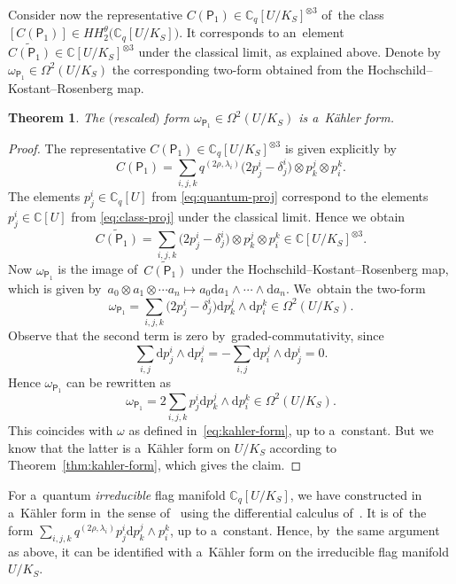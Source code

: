 \documentclass[pdftex]{sigma}
\numberwithin{equation}{section}
\newtheorem{Theorem}{Theorem}[section]
\newcommand{\CU}{\mathbb{C}[U]}
\newcommand{\CqU}{\mathbb{C}_q[U]}
\newcommand{\Cqflag}{\mathbb{C}_q[U / K_S]}
\newcommand{\diff}{\mathrm{d}}
\newcommand{\bbC}{\mathbb{C}}
\newcommand{\proj}{\mathsf{P}}
\newcommand{\kafo}{\omega}
\begin{document}
Consider now the representative $C(\proj_1) \in \Cqflag^{\otimes 3}$ of~the class $[C(\proj_1)] \in HH^\theta_2\big(\Cqflag\big)$.
It corresponds to an~element $\widetilde{C(\proj_1)} \in \bbC[U / K_S]^{\otimes 3}$ under the classical limit, as explained above.
Denote by~$\omega_{\proj_1} \in \Omega^2(U / K_S)$ the corresponding two-form obtained from the Hoch\-schild--Kostant--Rosenberg map.

\begin{Theorem}
The $($rescaled$)$ form $\omega_{\proj_1} \in \Omega^2(U / K_S)$ is a~K\"ahler form.
\end{Theorem}

\begin{proof}
The representative $C(\proj_1) \in \Cqflag^{\otimes 3}$ is given explicitly by
\[
C(\proj_1) = \sum_{i, j, k} q^{(2 \rho, \lambda_i)} \big(2 p^i_j - \delta^i_j\big) \otimes p^j_k \otimes p^k_i.
\]
The elements $p^i_j \in \CqU$ from \eqref{eq:quantum-proj} correspond to the elements $p^i_j \in \CU$ from \eqref{eq:class-proj} under the classical limit.
Hence we obtain
\[
\widetilde{C(\proj_1)} = \sum_{i, j, k} \big(2 p^i_j - \delta^i_j\big) \otimes p^j_k \otimes p^k_i \in \bbC[U / K_S]^{\otimes 3}.
\]
Now $\omega_{\proj_1}$ is the image of~$\widetilde{C(\proj_1)}$ under the Hoch\-schild--Kostant--Rosenberg map, which is given by~$a_0 \otimes a_1 \otimes \cdots a_n \mapsto a_0 \diff a_1 \wedge \cdots \wedge \diff a_n$. We~obtain the two-form
\[
\omega_{\proj_1} = \sum_{i, j, k} \big(2 p^i_j - \delta^i_j\big) \diff p^j_k \wedge \diff p^k_i \in \Omega^2(U / K_S).
\]
Observe that the second term is zero by~graded-commutativity, since
\[
\sum_{i, j} \diff p^i_j \wedge \diff p^j_i = - \sum_{i, j} \diff p^j_i \wedge \diff p^i_j = 0.
\]
Hence $\omega_{\proj_1}$ can be rewritten as
\[
\omega_{\proj_1} = 2 \sum_{i, j, k} p^i_j \diff p^j_k \wedge \diff p^k_i \in \Omega^2(U / K_S).
\]
This coincides with $\kafo$ as defined in~\eqref{eq:kahler-form}, up to a~constant.
But we know that the latter is a~K\"ahler form on $U / K_S$ according to Theorem~\ref{thm:kahler-form}, which gives the claim.
\end{proof}

\begin{Remark}
For a~quantum \emph{irreducible} flag manifold $\Cqflag$, we have constructed in~\cite{mat-kahler} a~K\"ahler form in~the sense of~\cite{obu17} using the differential calculus of~\cite{heko06}.
It is of~the form $\sum_{i, j, k} q^{(2 \rho, \lambda_i)} p^i_j \diff p^j_k \wedge p^k_i$, up to a~constant.
Hence, by~the same argument as above, it can be identified with a~K\"ahler form on the irreducible flag manifold $U / K_S$.
\end{Remark}
\end{document}
